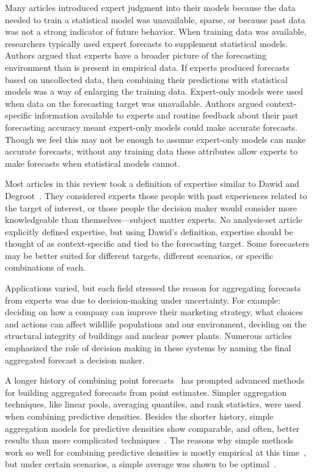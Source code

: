 \documentclass[preprint,authoryear,nonatbib]{elsarticle}
\begin{document}
Many articles introduced expert judgment into their models because the data needed to train a statistical model was unavailable, sparse, or because past data was not a strong indicator of future behavior.
When training data was available, researchers typically used expert forecasts to supplement statistical models.
Authors argued that experts have a broader picture of the forecasting environment than is present in empirical data. 
If experts produced forecasts based on uncollected data, then combining their predictions with statistical models was a way of enlarging the training data. 
Expert-only models were used when data on the forecasting target was unavailable.
Authors argued context-specific information available to experts and routine feedback about their past forecasting accuracy meant expert-only models could make accurate forecasts.
Though we feel this may not be enough to assume expert-only models can make accurate forecasts, without any training data these attributes allow experts to make forecasts when statistical models cannot.

Most articles in this review took a definition of expertise similar to Dawid and Degroot~\parencite{dawid1995coherent}.
They considered experts those people with past experiences related to the target of interest, or those people the decision maker would consider more knowledgeable than themselves---subject matter experts.
No analysis-set article explicitly defined expertise, but using Dawid's definition, expertise should be thought of as context-specific and tied to the forecasting target.
Some forecasters may be better suited for different targets, different scenarios, or specific combinations of each.

Applications varied, but each field stressed the reason for aggregating forecasts from experts was due to decision-making under uncertainty. 
For example: deciding on how a company can improve their marketing strategy, what choices and actions can affect wildlife populations and our environment, deciding on the structural integrity of buildings and nuclear power plants.
Numerous articles emphasized the role of decision making in these systems by naming the final aggregated forecast a decision maker.

A longer history of combining point forecasts~\parencite{galton1907vox,bates1969combination,granger1984improved} has prompted advanced methods for building aggregated forecasts from point estimates. 
Simpler aggregation techniques, like linear pools, averaging quantiles, and rank statistics, were used when combining predictive densities.
Besides the shorter history, simple aggregation models for predictive densities show comparable, and often, better results than more complicated techniques~\parencite{clemen1989combining,rantilla1999aggregation}.
The reasons why simple methods work so well for combining predictive densities is mostly empirical at this time~\parencite{makridakis1983averages,clemen1989combining,rantilla1999aggregation}, but under certain scenarios, a simple average was shown to be optimal~\parencite{wallsten1997evaluating,wallsten1997combining}.
\end{document}
